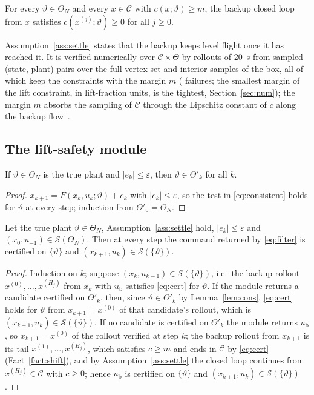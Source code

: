 \begin{assumption}\label{ass:settle}
For every $\vartheta\in\Theta_N$ and every $x\in\mathcal C$ with $c(x;\vartheta)\ge m$, the backup closed loop from $x$ satisfies $c(x^{(j)};\vartheta)\ge0$ for all $j\ge0$.
\end{assumption}
\noindent Assumption~\ref{ass:settle} states that the backup keeps level flight once it has reached it. It is verified numerically over $\mathcal C\times\Theta$ by rollouts of \SI{20}{s} from \numSettlePairs{} sampled (state, plant) pairs over the full vertex set and interior samples of the box, all of which keep the constraints with the margin $m$ (\numSettleFail{} failures; the smallest margin of the lift constraint, \numSettleWorst{} in lift-fraction units, is the tightest, Section~\ref{sec:num}); the margin $m$ absorbs the sampling of $\mathcal C$ through the Lipschitz constant of $c$ along the backup flow~\cite{Bobiti2018}.

\subsection{The lift-safety module}
\begin{lemma}\label{lem:cons}
If $\vartheta\in\Theta_N$ is the true plant and $|e_k|\le\varepsilon$, then $\vartheta\in\Theta'_k$ for all $k$.
\end{lemma}
\begin{proof}
$x_{k+1}=F(x_k,u_k;\vartheta)+e_k$ with $|e_k|\le\varepsilon$, so the test in \eqref{eq:consistent} holds for $\vartheta$ at every step; induction from $\Theta'_0=\Theta_N$.
\end{proof}

\begin{lemma}\label{lem:rf}
Let the true plant $\vartheta\in\Theta_N$, Assumption~\ref{ass:settle} hold, $|e_k|\le\varepsilon$ and $(x_0,u_{-1})\in\mathcal S(\Theta_N)$. Then at every step the command returned by \eqref{eq:filter} is certified on $\{\vartheta\}$ and $(x_{k+1},u_k)\in\mathcal S(\{\vartheta\})$.
\end{lemma}
\begin{proof}
Induction on $k$; suppose $(x_k,u_{k-1})\in\mathcal S(\{\vartheta\})$, i.e.\ the backup rollout $x^{(0)},\dots,x^{(H_j)}$ from $x_k$ with $u_{\mathrm b}$ satisfies \eqref{eq:cert} for $\vartheta$. If the module returns a candidate certified on $\Theta'_k$, then, since $\vartheta\in\Theta'_k$ by Lemma~\ref{lem:cons}, \eqref{eq:cert} holds for $\vartheta$ from $x_{k+1}=x^{(0)}$ of that candidate's rollout, which is $(x_{k+1},u_k)\in\mathcal S(\{\vartheta\})$. If no candidate is certified on $\Theta'_k$ the module returns $u_{\mathrm b}$, so $x_{k+1}=x^{(0)}$ of the rollout verified at step $k$; the backup rollout from $x_{k+1}$ is its tail $x^{(1)},\dots,x^{(H_j)}$, which satisfies $c\ge m$ and ends in $\mathcal C$ by \eqref{eq:cert} (Fact~\ref{fact:shift}), and by Assumption~\ref{ass:settle} the closed loop continues from $x^{(H_j)}\in\mathcal C$ with $c\ge0$; hence $u_{\mathrm b}$ is certified on $\{\vartheta\}$ and $(x_{k+1},u_k)\in\mathcal S(\{\vartheta\})$.
\end{proof}

